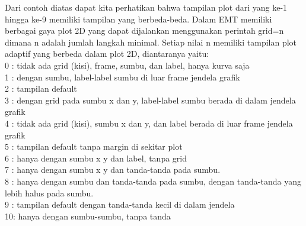 \documentclass[a4paper,10pt]{article}
\begin{document}
\begin{eulernotebook}
\begin{eulercomment}
\begin{eulercomment}
\begin{eulercomment}
Dari contoh diatas dapat kita perhatikan bahwa tampilan plot dari yang
ke-1 hingga ke-9 memiliki tampilan yang berbeda-beda. Dalam EMT
memiliki berbagai gaya plot 2D yang dapat dijalankan menggunakan
perintah grid=n dimana n adalah jumlah langkah minimal. Setiap nilai n
memiliki tampilan plot adaptif yang berbeda dalam plot 2D, diantaranya
yaitu:\\
0 : tidak ada grid (kisi), frame, sumbu, dan label, hanya kurva saja\\
1 : dengan sumbu, label-label sumbu di luar frame jendela grafik\\
2 : tampilan default\\
3 : dengan grid pada sumbu x dan y, label-label sumbu berada di dalam
jendela grafik\\
4 : tidak ada grid (kisi), sumbu x dan y, dan label berada di luar
frame jendela grafik\\
5 : tampilan default tanpa margin di sekitar plot\\
6 : hanya dengan sumbu x y dan label, tanpa grid\\
7 : hanya dengan sumbu x y dan tanda-tanda pada sumbu.\\
8 : hanya dengan sumbu dan tanda-tanda pada sumbu, dengan tanda-tanda
yang lebih halus pada sumbu.\\
9 : tampilan default dengan tanda-tanda kecil di dalam jendela\\
10: hanya dengan sumbu-sumbu, tanpa tanda


\end{eulercomment}
\end{eulercomment}
\end{eulercomment}
\end{eulernotebook}
\end{document}
